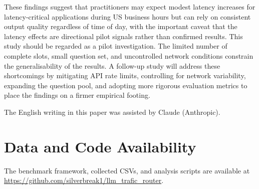 \documentclass[11pt]{article}
\begin{document}
These findings suggest that practitioners may expect modest latency increases for
latency-critical applications during US business hours but can rely on consistent output
quality regardless of time of day, with the important caveat that the latency effects are
directional pilot signals rather than confirmed results.
This study should be regarded as a pilot investigation. The limited number of complete slots, small question set, and uncontrolled network conditions constrain the generalisability of the results. A follow-up study will address these shortcomings by mitigating API rate limits, controlling for network variability, expanding the question pool, and adopting more rigorous evaluation metrics to place the findings on a firmer empirical footing.


The English writing in this paper was assisted by Claude (Anthropic).

\section*{Data and Code Availability}

The benchmark framework, collected CSVs, and analysis scripts are available at
\url{https://github.com/silverbreak1/llm_trafic_router}.



\end{document}
